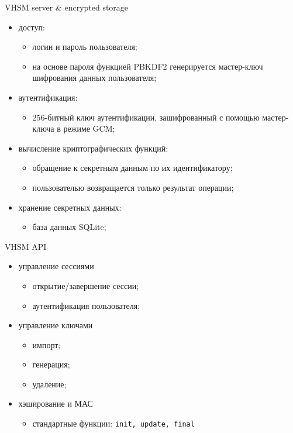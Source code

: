 \documentclass[utf8, 11pt]{beamer}
\begin{document}
\begin{frame}{VHSM server \& encrypted storage}

\begin{itemize}
\item доступ:
\begin{itemize}
	\item логин и пароль пользователя;
	\item на основе пароля функцией PBKDF2 генерируется мастер-ключ шифрования данных пользователя;
\end{itemize}

\item аутентификация:
\begin{itemize}
	\item 256-битный ключ аутентификации, зашифрованный с помощью мастер-ключа в режиме GCM;
\end{itemize}

\item вычисление криптографических функций:
\begin{itemize}
	\item обращение к секретным данным по их идентификатору;
	\item пользователью возвращается только результат операции;
\end{itemize}

\item хранение секретных данных:
\begin{itemize}
	\item база данных SQLite;
\end{itemize}
\end{itemize}

\vspace*{\fill}

\end{frame}

\begin{frame}{VHSM API}

\begin{itemize}
\item управление сессиями
\begin{itemize}
\item открытие/завершение сессии;
\item аутентификация пользователя;
\end{itemize}

\item управление ключами
\begin{itemize}
\item импорт;
\item генерация;
\item удаление;
\end{itemize}

\item хэширование и МАС
\begin{itemize}
\item стандартные функции: \texttt{init, update, final}
\end{itemize}
\end{itemize}

\vspace*{\fill}

\end{frame}
\end{document}
